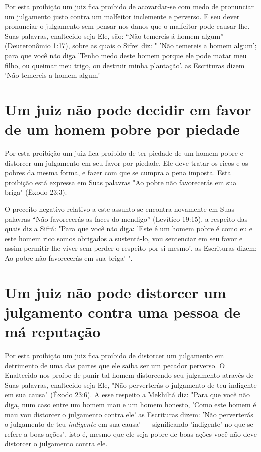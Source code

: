Por esta proibição um juiz fica proibido de acovardar-se com medo de
pronunciar um julgamento justo contra um malfeitor inclemente e
perver­so. E seu dever pronunciar o julgamento sem pensar nos danos que
o malfeitor pode causar-lhe. Suas palavras, enaltecido seja Ele, são:
``Não temereis á homem algum'' (Deuteronômio 1:17), sobre as quais o
Sifrei diz: " 'Não temereis a ho­mem algum'; para que você não diga
'Tenho medo deste homem porque ele pode matar meu filho, ou queimar meu
trigo, ou destruir minha plantação'. as Escrituras dizem 'Não temereis a
homem algum'

\section{Um juiz não pode decidir em favor de um homem pobre por piedade}

Por esta proibição um juiz fica proibido de ter piedade de um ho­mem
pobre e distorcer um julgamento em seu favor por piedade. Ele deve
tra­tar os ricos e os pobres da mesma forma, e fazer com que se cumpra a
pena imposta. Esta proibição está expressa em Suas palavras "Ao pobre
não favore­cerás em sua briga" (Êxodo 23:3).

O preceito negativo relativo a este assunto se encontra novamente em
Suas palavras ``Não favorecerás as faces do mendigo'' (Levítico 19:15), a
res­peito das quais diz a Sifrá: "Para que você não diga: 'Este é um
homem pobre é como eu e este homem rico somos obrigados a sustentá-lo,
vou sentenciar em seu favor e assim permitir-lhe viver sem perder o
respeito por si mesmo', as Escrituras dizem: Ao pobre não favorecerás em
sua briga' ".

\section{Um juiz não pode distorcer um julgamento contra uma pessoa de má reputação}

Por esta proibição um juiz fica proibido de distorcer um julgamento em
detrimento de uma das partes que ele saiba ser um pecador perverso. O
Enaltecido nos proíbe de punir tal homem distorcendo seu julgamento
através de Suas palavras, enaltecido seja Ele, "Não perverterás o
julgamento de teu in­digente em sua causa" (Êxodo 23:6). A esse respeito
a Mekhiltá diz: "Para que você não diga, num caso entre um homem mau e
um homem honesto, 'Como este homem é mau vou distorcer o julgamento
contra ele' as Escrituras dizem: 'Não perverterás o julgamento de teu
\emph{indigente} em sua causa' --- significando 'indigente' no que se
refere a boas ações", isto é, mesmo que ele seja pobre de boas ações
você não deve distorcer o julgamento contra ele.

